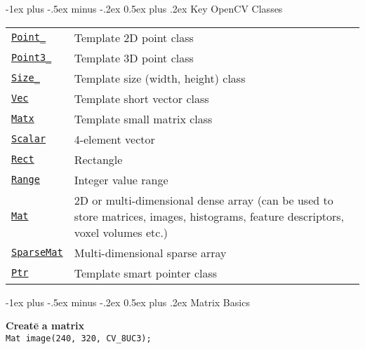 \documentclass[10pt,landscape]{article}
\makeatletter
\renewcommand{\section}{\@startsection{section}{1}{0mm}%
                                {-1ex plus -.5ex minus -.2ex}%
                                {0.5ex plus .2ex}%
                                {\normalfont\large\bfseries}}
\makeatother
\begin{document}
\begin{multicols}{3}
\section{Key OpenCV Classes}
\begin{tabular}{@{}p{\the\MyLen}%
                @{}p{\linewidth-\the\MyLen}@{}}
\texttt{\href{http://opencv.itseez.com/modules/core/doc/basic_structures.html\#Point_}{Point\_}} & Template 2D point class \\
\texttt{\href{http://opencv.itseez.com/modules/core/doc/basic_structures.html\#Point3_}{Point3\_}} & Template 3D point class \\
\texttt{\href{http://opencv.itseez.com/modules/core/doc/basic_structures.html\#Size_}{Size\_}} & Template size (width, height) class \\
\texttt{\href{http://opencv.itseez.com/modules/core/doc/basic_structures.html\#Vec}{Vec}} & Template short vector class \\
\texttt{\href{http://opencv.itseez.com/modules/core/doc/basic_structures.html\#Matx}{Matx}} & Template small matrix class \\
\texttt{\href{http://opencv.itseez.com/modules/core/doc/basic_structures.html\#Scalar_}{Scalar}} & 4-element vector \\
\texttt{\href{http://opencv.itseez.com/modules/core/doc/basic_structures.html\#Rect_}{Rect}} & Rectangle \\
\texttt{\href{http://opencv.itseez.com/modules/core/doc/basic_structures.html\#Range}{Range}} & Integer value range \\
\texttt{\href{http://opencv.itseez.com/modules/core/doc/basic_structures.html\#Mat}{Mat}} & 2D or multi-dimensional dense array (can be used to store matrices, images, histograms, feature descriptors, voxel volumes etc.)\\
\texttt{\href{http://opencv.itseez.com/modules/core/doc/basic_structures.html\#sparsemat}{SparseMat}} & Multi-dimensional sparse array \\
\texttt{\href{http://opencv.itseez.com/modules/core/doc/basic_structures.html\#Ptr}{Ptr}} & Template smart pointer class
\end{tabular}

\section{Matrix Basics}
\begin{tabbing}

\textbf{Cr}\=\textbf{ea}\=\textbf{te}\={} \textbf{a matrix} \\
\> \texttt{Mat image(240, 320, CV\_8UC3);} \\


\end{tabbing}
\end{multicols}
\end{document}
